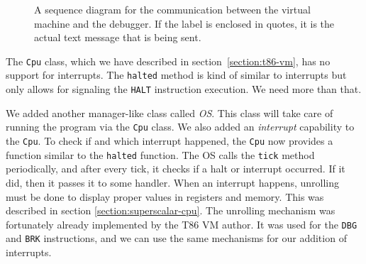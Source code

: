\begin{figure}
    \centering
    \scalebox{0.8} {
    }
    \caption{A sequence diagram for the communication between the virtual
    machine and the debugger. If the label is enclosed in quotes, it is the
    actual text message that is being sent.} \label{fig:dbg-vm-seq}
\end{figure}

The \texttt{Cpu} class, which we have described in
section~\ref{section:t86-vm}, has no support for interrupts. The
\texttt{halted} method is kind of similar to interrupts but only allows for
signaling the \texttt{HALT} instruction execution. We need more than that.

We added another manager-like class called \textit{OS}. This class will take
care of running the program via the \texttt{Cpu} class. We also added an
\textit{interrupt} capability to the \texttt{Cpu}. To check if and which
interrupt happened, the \texttt{Cpu} now provides a function similar to the
\texttt{halted} function. The OS calls the \texttt{tick} method periodically,
and after every tick, it checks if a halt or interrupt occurred. If it did,
then it passes it to some handler. When an interrupt happens, unrolling must be
done to display proper values in registers and memory. This was described in
section \ref{section:superscalar-cpu}. The unrolling mechanism was fortunately
already implemented by the T86 VM author. It was used for the \texttt{DBG} and
\texttt{BRK} instructions, and we can use the same mechanisms for our addition
of interrupts.

